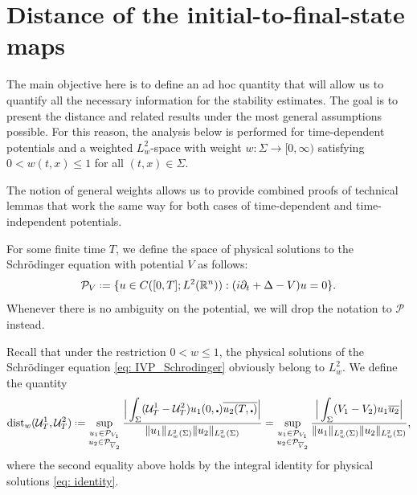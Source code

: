 \documentclass[10pt,a4paper]{amsart}
\theoremstyle{remark}
\theoremstyle{definition}
\newcommand{\R}{\mathbb{R}}
\newcommand*{\defeq}{\mathrel{\vcenter{\baselineskip0.5ex \lineskiplimit0pt
			\hbox{\scriptsize.}\hbox{\scriptsize.}}}%
	=}
\newcommand{\dist}{\mathrm{dist}}
\def\cal{\mathcal}
\def\ovl{\overline}
\def\cd{\centerdot}
\def\d{\partial}
\begin{document}







\section{Distance of the initial-to-final-state maps}\label{sec: distance_and_density}
The main objective here is to define an ad hoc quantity 
that will allow us to quantify all the necessary information for the stability estimates.  
The goal is to present the distance and related results under the most general assumptions possible. For this reason, the analysis below is performed for time-dependent potentials and a weighted $L^2_w$-space with weight $w:\Sigma\to[0,\infty)$ satisfying $0<w(t,x)\leq1$ for all $(t,x)\in\Sigma$. 

The notion of general weights allows us to provide combined proofs of technical lemmas that work the same way for both cases of time-dependent and time-independent potentials.

For some finite time $T$, we define the space of physical solutions to the Schr\"odinger equation with potential $V$ as follows:
%
\begin{equation}\label{eq: space_physical_solutions}
\cal{P}_V \defeq \{ u\in C([0, T]; L^2(\R^n)) : (i\d_t + \Delta - V)u=0\}.
\end{equation}
%
Whenever there is no ambiguity on the potential, we will drop the notation to $\cal P$ instead.

Recall that under the restriction $0<w\leq1$, the physical solutions of the Schr\"odinger equation \eqref{eq: IVP_Schrodinger} obviously belong to $L^2_w$.
We define the quantity 
%
\begin{equation}\label{eq: distance}
\dist_w(\cal{U}_T^1, \cal{U}_T^2) \defeq
\sup_{\substack{u_1 \in \cal{P}_{V_1}\\ u_2 \in \cal{P}_{\overline{V}_2}}} \frac{\Big| \displaystyle \int_\Sigma (\cal{U}_T^1-\cal{U}_T^2) u_1(0, \cd) \ovl{u_2(T, \cd)}\Big|}{\|u_1\|_{L^2_w(\Sigma)} \| u_2\|_{L^2_w(\Sigma)}}
%
=\sup_{\substack{u_1 \in \cal{P}_{V_1}\\ u_2 \in \cal{P}_{\overline{V}_2}}} \frac{\Big| \displaystyle \int_\Sigma (V_1 - V_2) u_1 \ovl{u_2} \Big|}{\|u_1\|_{L^2_w(\Sigma)} \| u_2\|_{L^2_w(\Sigma)}},
\end{equation}
%
where the second equality above holds by the integral identity for physical solutions \eqref{eq: identity}. 
\end{document}
